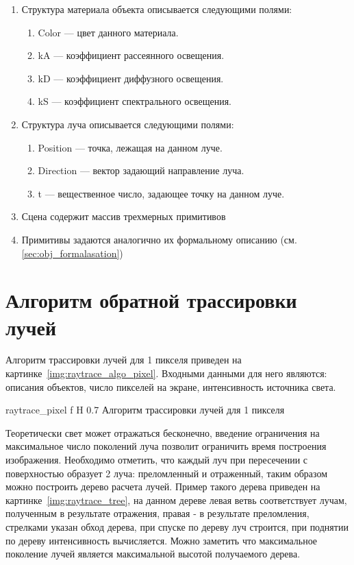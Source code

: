 \begin{enumerate}
	\item Структура материала объекта описывается следующими полями:
	\begin{enumerate}
		\item Color --- цвет данного материала.
		\item kA --- коэффициент рассеянного освещения.
		\item kD --- коэффициент диффузного освещения.
		\item kS --- коэффициент спектрального освещения.
	\end{enumerate}


	\item Структура луча описывается следующими полями:
	\begin{enumerate}
		\item Position --- точка, лежащая на данном луче.
		\item Direction --- вектор задающий направление луча.
		\item t --- вещественное число, задающее точку на данном луче.
	\end{enumerate}

	\item Сцена содержит массив трехмерных примитивов
	\item Примитивы задаются аналогично их формальному описанию (см.\ref{sec:obj_formalasation})
\end{enumerate}



\section{Алгоритм обратной трассировки лучей}
Алгоритм трассировки лучей для 1 пикселя приведен на картинке~\ref{img:raytrace_algo_pixel}. Входными данными для него являются: описания объектов, число пикселей на экране,
интенсивность источника света.


{raytrace_pixel} %
{f} %
{H} %
{0.7\textwidth} %
{Алгоритм трассировки лучей для 1 пикселя} %




Теоретически свет может отражаться бесконечно, введение ограничения на максимальное число поколений луча позволит ограничить время построения изображения.
Необходимо отметить, что каждый луч при пересечении с поверхностью образует 2 луча: преломленный и отраженный, таким образом можно построить дерево расчета лучей.
Пример такого дерева приведен на картинке~\ref{img:raytrace_tree}, на данном дереве левая ветвь соответствует лучам, полученным в результате отражения, правая - в результате преломления,
стрелками указан обход дерева, при спуске по дереву луч строится, при поднятии по дереву интенсивность вычисляется. Можно заметить что максимальное поколение лучей является максимальной высотой получаемого дерева.

